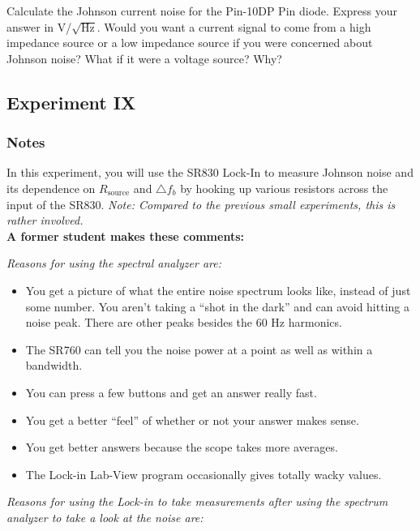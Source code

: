 \documentclass{../lab}
\begin{document}
Calculate the Johnson current noise for the Pin-10DP Pin diode. Express your answer in V/$\sqrt{\text{Hz}}$. Would you want a current signal to come from a high impedance source or a low impedance source if you were concerned about Johnson noise? What if it were a voltage source? Why?

\subsection{Experiment IX}

\subsubsection{Notes}

In this experiment, you will use the SR830 Lock-In to measure Johnson noise and its dependence on $ R_\text{source} $ and $ \triangle f_b $ by hooking up various resistors across the input of the SR830. \emph{Note: Compared to the previous small experiments, this is rather involved.}\\

\noindent\textbf{A former student makes these comments:}

\noindent\emph{Reasons for using the spectral analyzer are:}

\begin{itemize}
    \item You get a picture of what the entire noise spectrum looks like, instead of just some number. You aren't taking a ``shot in the dark'' and can avoid hitting a noise peak. There are other peaks besides the 60 Hz harmonics.

    \item The SR760 can tell you the noise power at a point as well as within a bandwidth.

    \item You can press a few buttons and get an answer really fast.

    \item You get a better ``feel'' of whether or not your answer makes sense.

    \item You get better answers because the scope takes more averages.

    \item The Lock-in Lab-View program occasionally gives totally wacky values.
\end{itemize}

\noindent\emph{Reasons for using the Lock-in to take measurements after using the spectrum analyzer to take a look at the noise are:}
\end{document}
